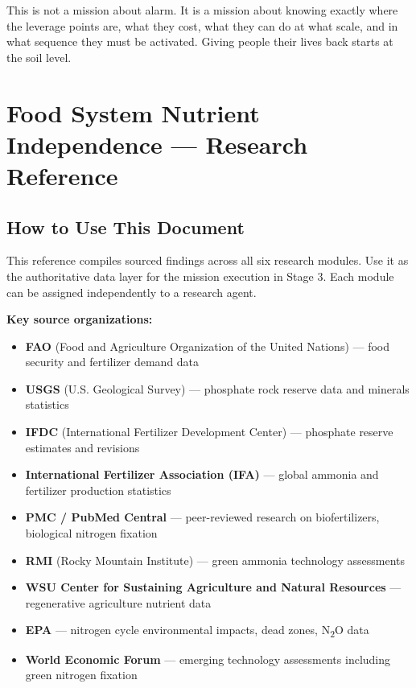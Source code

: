 \documentclass[11pt,letterpaper]{article}
\newcommand{\stageheader}[2]{%
  \noindent\colorbox{#2}{\makebox[\textwidth][l]{%
    \textcolor{white}{\bfseries\sffamily\hspace{6pt}#1\hspace{6pt}}}}%
  \vspace{0.5em}\par%
}
\begin{document}
This is not a mission about alarm. It is a mission about knowing exactly where the leverage points are, what they cost, what they can do at what scale, and in what sequence they must be activated. Giving people their lives back starts at the soil level.

\newpage

\stageheader{STAGE 2 --- RESEARCH REFERENCE}{secondary}

\section{Food System Nutrient Independence --- Research Reference}

\subsection{How to Use This Document}

This reference compiles sourced findings across all six research modules. Use it as the authoritative data layer for the mission execution in Stage 3. Each module can be assigned independently to a research agent.

\textbf{Key source organizations:}
\begin{itemize}[leftmargin=1.5em]
  \item \textbf{FAO} (Food and Agriculture Organization of the United Nations) --- food security and fertilizer demand data
  \item \textbf{USGS} (U.S. Geological Survey) --- phosphate rock reserve data and minerals statistics
  \item \textbf{IFDC} (International Fertilizer Development Center) --- phosphate reserve estimates and revisions
  \item \textbf{International Fertilizer Association (IFA)} --- global ammonia and fertilizer production statistics
  \item \textbf{PMC / PubMed Central} --- peer-reviewed research on biofertilizers, biological nitrogen fixation
  \item \textbf{RMI} (Rocky Mountain Institute) --- green ammonia technology assessments
  \item \textbf{WSU Center for Sustaining Agriculture and Natural Resources} --- regenerative agriculture nutrient data
  \item \textbf{EPA} --- nitrogen cycle environmental impacts, dead zones, N\textsubscript{2}O data
  \item \textbf{World Economic Forum} --- emerging technology assessments including green nitrogen fixation
\end{itemize}
\end{document}
